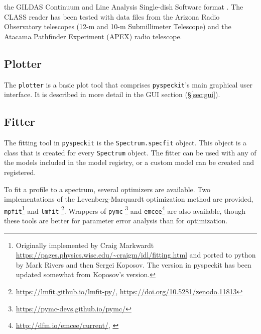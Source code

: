 \documentclass[twocolumn]{aastex63}
\newcommand{\pyspeckit}{\texttt{pyspeckit}\xspace}
\begin{document}
\begin{itemize}
        the GILDAS Continuum and Line Analysis Single-dish Software format
        \citep[CLASS;][]{Gildas-Team2013a}.  
        The CLASS reader has been tested with data files from
        the Arizona Radio Observatory telescopes (12-m and 10-m Submillimeter
        Telescope) and the Atacama Pathfinder Experiment (APEX) radio
        telescope.
\end{itemize}

\subsection{Plotter}
The \texttt{plotter} is a basic plot tool that comprises \pyspeckit's main
graphical user interface.
It is described in more detail in the  GUI section (\S \ref{sec:gui}).


\subsection{Fitter}
\label{sec:fitters}
The fitting tool in \pyspeckit is the \texttt{Spectrum.specfit} object.
This object is a class that is created for every \texttt{Spectrum} object.
The fitter can be used with any of the models included in the model
registry, or a custom model can be created and registered.

To fit a profile to a spectrum, several optimizers are available.  Two
implementations of the Levenberg-Marquardt optimization method
\citep{Levenberg1944a,Marquardt1963a} are provided,
\texttt{mpfit}\footnote{Originally implemented by Craig Markwardt \citet{Markwardt2009}
\url{https://pages.physics.wisc.edu/~craigm/idl/fitting.html} and ported to python
by Mark Rivers and then Sergei Koposov.  The version in pyspeckit has been
updated somewhat from Koposov's version.} and
\texttt{lmfit} \citep{Newville2014}\footnote{\url{https://lmfit.github.io/lmfit-py/},
\url{https://doi.org/10.5281/zenodo.11813}}.  Wrappers of
\texttt{pymc} \citep{Salvatier2016}\footnote{\url{https://pymc-devs.github.io/pymc/}} and
\texttt{emcee}\footnote{\url{http://dfm.io/emcee/current/},
\citet{Foreman-Mackey2013a}} are also available, though these tools are better
for parameter error analysis than for optimization.
\end{document}
